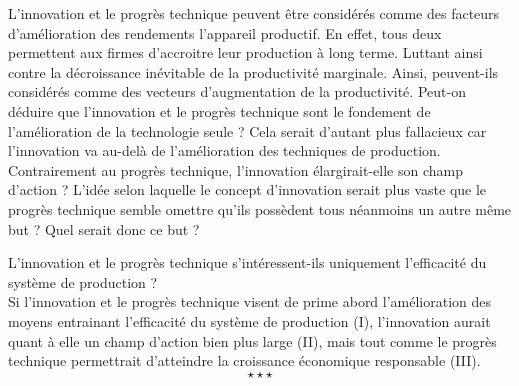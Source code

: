 	\hspace*{.5cm}L'innovation et le progrès technique peuvent être considérés comme des facteurs d'amélioration des rendements l'appareil productif. En effet, tous deux permettent aux firmes d'accroitre leur production à long terme. Luttant ainsi contre la décroissance inévitable de la productivité marginale. Ainsi, peuvent-ils considérés comme des vecteurs d'augmentation de la productivité. Peut-on déduire que l'innovation et le progrès technique sont le fondement de l'amélioration de la technologie seule ? Cela serait d'autant plus fallacieux car l'innovation va au-delà de l'amélioration des techniques de production. Contrairement au progrès technique, l'innovation élargirait-elle son champ d'action ? L'idée selon laquelle le concept d'innovation serait plus vaste que le progrès technique semble omettre qu'ils possèdent tous néanmoins un autre même but ? Quel serait donc ce but ? 
	
	\hspace*{.5cm}L'innovation et le progrès technique s'intéressent-ils uniquement l'efficacité du système de production ?\\
	
	\hspace*{.5cm}Si l'innovation et le progrès technique visent de prime abord l'amélioration des moyens entrainant l'efficacité du système de production (I), l'innovation aurait quant à elle un champ d'action bien plus large (II), mais tout comme le progrès technique permettrait d'atteindre la croissance économique responsable (III).$$\star \star \star$$

